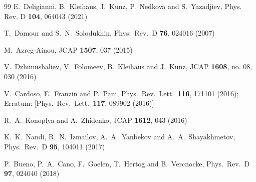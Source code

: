 \documentclass{article}
\begin{document}
\begin{small}
\begin{thebibliography}{99}
E.~Deligianni, B.~Kleihaus, J.~Kunz, P.~Nedkova and S.~Yazadjiev,
Phys. Rev. D \textbf{104},  064043 (2021)

  T.~Damour and S.~N.~Solodukhin,
  Phys.\ Rev.\ D {\bf 76}, 024016 (2007)

  M.~Azreg-Ainou,
  JCAP {\bf 1507}, 037 (2015)

  V.~Dzhunushaliev, V.~Folomeev, B.~Kleihaus and J.~Kunz,
  JCAP {\bf 1608}, no. 08, 030 (2016)

  V.~Cardoso, E.~Franzin and P.~Pani,
  Phys.\ Rev.\ Lett.\  {\bf 116}, 171101 (2016);
  Erratum: [Phys.\ Rev.\ Lett.\  {\bf 117}, 089902 (2016)]

  R.~A.~Konoplya and A.~Zhidenko,
  JCAP {\bf 1612}, 043 (2016)

  K.~K.~Nandi, R.~N.~Izmailov, A.~A.~Yanbekov and A.~A.~Shayakhmetov,
  Phys.\ Rev.\ D {\bf 95}, 104011 (2017)

  P.~Bueno, P.~A.~Cano, F.~Goelen, T.~Hertog and B.~Vercnocke,
  Phys.\ Rev.\ D {\bf 97}, 024040 (2018)


\end{thebibliography}
\end{small}
\end{document}
